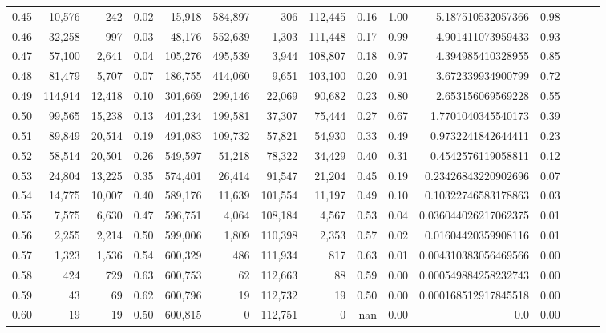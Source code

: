 \begin{tabular}{rrrrrrrrrrrrrrr}
0.45 &   10,576 &     242 &  0.02 &   15,918 &  584,897 &      306 &  112,445 &  0.16 &  1.00 &     5.187510532057366 &      0.98 \\
0.46 &   32,258 &     997 &  0.03 &   48,176 &  552,639 &    1,303 &  111,448 &  0.17 &  0.99 &     4.901411073959433 &      0.93 \\
0.47 &   57,100 &   2,641 &  0.04 &  105,276 &  495,539 &    3,944 &  108,807 &  0.18 &  0.97 &     4.394985410328955 &      0.85 \\
0.48 &   81,479 &   5,707 &  0.07 &  186,755 &  414,060 &    9,651 &  103,100 &  0.20 &  0.91 &     3.672339934900799 &      0.72 \\
0.49 &  114,914 &  12,418 &  0.10 &  301,669 &  299,146 &   22,069 &   90,682 &  0.23 &  0.80 &     2.653156069569228 &      0.55 \\
0.50 &   99,565 &  15,238 &  0.13 &  401,234 &  199,581 &   37,307 &   75,444 &  0.27 &  0.67 &    1.7701040345540173 &      0.39 \\
0.51 &   89,849 &  20,514 &  0.19 &  491,083 &  109,732 &   57,821 &   54,930 &  0.33 &  0.49 &    0.9732241842644411 &      0.23 \\
0.52 &   58,514 &  20,501 &  0.26 &  549,597 &   51,218 &   78,322 &   34,429 &  0.40 &  0.31 &    0.4542576119058811 &      0.12 \\
0.53 &   24,804 &  13,225 &  0.35 &  574,401 &   26,414 &   91,547 &   21,204 &  0.45 &  0.19 &   0.23426843220902696 &      0.07 \\
0.54 &   14,775 &  10,007 &  0.40 &  589,176 &   11,639 &  101,554 &   11,197 &  0.49 &  0.10 &   0.10322746583178863 &      0.03 \\
0.55 &    7,575 &   6,630 &  0.47 &  596,751 &    4,064 &  108,184 &    4,567 &  0.53 &  0.04 &  0.036044026217062375 &      0.01 \\
0.56 &    2,255 &   2,214 &  0.50 &  599,006 &    1,809 &  110,398 &    2,353 &  0.57 &  0.02 &   0.01604420359908116 &      0.01 \\
0.57 &    1,323 &   1,536 &  0.54 &  600,329 &      486 &  111,934 &      817 &  0.63 &  0.01 &  0.004310383056469566 &      0.00 \\
0.58 &      424 &     729 &  0.63 &  600,753 &       62 &  112,663 &       88 &  0.59 &  0.00 &  0.000549884258232743 &      0.00 \\
0.59 &       43 &      69 &  0.62 &  600,796 &       19 &  112,732 &       19 &  0.50 &  0.00 &  0.000168512917845518 &      0.00 \\
0.60 &       19 &      19 &  0.50 &  600,815 &        0 &  112,751 &        0 &   nan &  0.00 &                   0.0 &      0.00 \\

\end{tabular}
